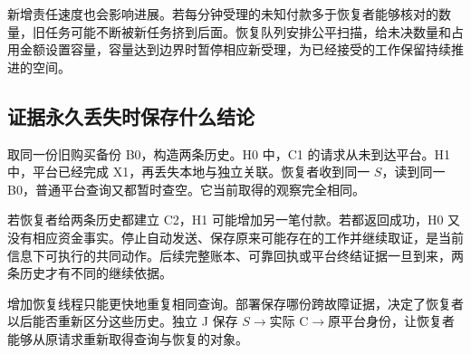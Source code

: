 新增责任速度也会影响进展。若每分钟受理的未知付款多于恢复者能够核对的数量，旧任务可能不断被新任务挤到后面。恢复队列安排公平扫描，给未决数量和占用金额设置容量，容量达到边界时暂停相应新受理，为已经接受的工作保留持续推进的空间。

\subsection*{证据永久丢失时保存什么结论}

取同一份旧购买备份 B0，构造两条历史。H0 中，C1 的请求从未到达平台。H1 中，平台已经完成 X1，再丢失本地与独立关联。恢复者收到同一 $S$，读到同一 B0，普通平台查询又都暂时查空。它当前取得的观察完全相同。

若恢复者给两条历史都建立 C2，H1 可能增加另一笔付款。若都返回成功，H0 又没有相应资金事实。停止自动发送、保存原来可能存在的工作并继续取证，是当前信息下可执行的共同动作。后续完整账本、可靠回执或平台终结证据一旦到来，两条历史才有不同的继续依据。

增加恢复线程只能更快地重复相同查询。部署保存哪份跨故障证据，决定了恢复者以后能否重新区分这些历史。独立 J 保存 $S\to$实际 C$\to$原平台身份，让恢复者能够从原请求重新取得查询与恢复的对象。

\FloatBarrier
